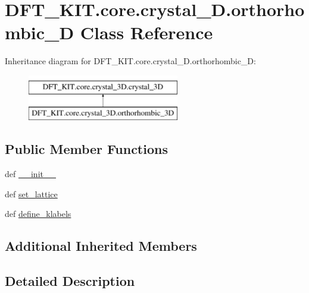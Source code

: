 \hypertarget{class_d_f_t___k_i_t_1_1core_1_1crystal__3_d_1_1orthorhombic__3_d}{\section{D\+F\+T\+\_\+\+K\+I\+T.\+core.\+crystal\+\_\+D.\+orthorhombic\+\_\+D Class Reference}
\label{class_d_f_t___k_i_t_1_1core_1_1crystal__3_d_1_1orthorhombic__3_d}
}
Inheritance diagram for D\+F\+T\+\_\+\+K\+I\+T.\+core.\+crystal\+\_\+D.\+orthorhombic\+\_\+D\+:\begin{figure}[H]
\begin{center}
\leavevmode
\includegraphics[height=2.000000cm]{class_d_f_t___k_i_t_1_1core_1_1crystal__3_d_1_1orthorhombic__3_d}
\end{center}
\end{figure}
\subsection*{Public Member Functions}
\begin{DoxyCompactItemize}
\item 
def \hyperlink{class_d_f_t___k_i_t_1_1core_1_1crystal__3_d_1_1orthorhombic__3_d_ac8aa417e23afd8497bdcbfd314788126}{\+\_\+\+\_\+init\+\_\+\+\_\+}
\item 
def \hyperlink{class_d_f_t___k_i_t_1_1core_1_1crystal__3_d_1_1orthorhombic__3_d_a9071af2f60daae5228990bf8ff73a49a}{set\+\_\+lattice}
\item 
def \hyperlink{class_d_f_t___k_i_t_1_1core_1_1crystal__3_d_1_1orthorhombic__3_d_a9697a1899c5f7368be6cdd2c25cf808d}{define\+\_\+klabels}
\end{DoxyCompactItemize}
\subsection*{Additional Inherited Members}


\subsection{Detailed Description}


